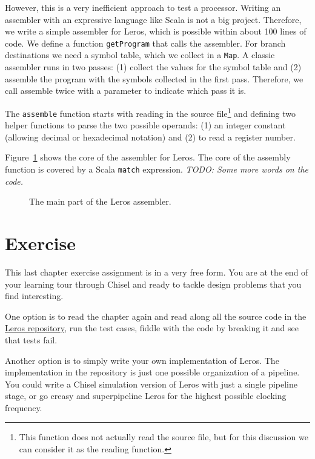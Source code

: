 \documentclass[%
    10pt, %
    headinclude, footexclude,
    openright, %
    notitlepage,
    cleardoubleempty,
    headsepline,
    pointlessnumbers,
    bibtotoc, idxtotoc,
    ]{scrbook}
\newcommand{\code}[1]{{\small{\texttt{#1}}}}
\newcommand{\todo}[1]{{\emph{TODO: #1}}}
\newcommand{\myref}[2]{\href{#1}{#2}}
\begin{document}


\noindent However, this is a very inefficient approach to test a processor.
Writing an assembler with an expressive language like Scala is not a big project.
Therefore, we write a simple assembler for Leros, which is possible within about
100 lines of code. We define a function \code{getProgram} that calls the assembler.
For branch destinations we need a symbol table, which we collect in a \code{Map}.
A classic assembler runs in two passes: (1) collect the values for the symbol table
and (2) assemble the program with the symbols collected in the first pass.
Therefore, we call assemble twice with a parameter to indicate which pass it is.



The \code{assemble} function starts with reading in the source
file\footnote{This function does not actually read the source file, but for this
discussion we can consider it as the reading function.}
and defining two helper functions to parse the two possible operands: (1) an
integer constant (allowing decimal or hexadecimal notation) and (2) to read
a register number.



Figure~\ref{fig:leros-asm-match} shows the core of the assembler for Leros.
The core of the assembly function is covered by a Scala \code{match}
expression. \todo{Some more words on the code.}



\begin{figure}[t]

\caption{The main part of the Leros assembler.}
\label{fig:leros-asm-match}
\end{figure}

\section{Exercise}

This last chapter exercise assignment is in a very free form. You are at the end
of your learning tour through Chisel and ready to tackle design problems that
you find interesting.

One option is to read the chapter again and read along all the source code in the
\myref{https://github.com/leros-dev/leros}{Leros repository}, run the test cases,
fiddle with the code by breaking it and see that tests fail.

Another option is to simply write your own implementation of Leros.
The implementation in the repository is just one possible organization of a pipeline.
You could write a Chisel simulation version of Leros with just a single pipeline stage,
or go creasy and superpipeline Leros for the highest possible clocking frequency.
\end{document}
